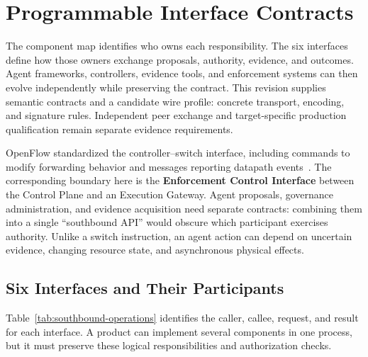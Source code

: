 \section{Programmable Interface Contracts}
\label{sec:interfaces}

The component map identifies who owns each responsibility. The six interfaces define how those owners exchange proposals, authority, evidence, and outcomes. Agent frameworks, controllers, evidence tools, and enforcement systems can then evolve independently while preserving the contract. This revision supplies semantic contracts and a candidate wire profile: concrete transport, encoding, and signature rules. Independent peer exchange and target-specific production qualification remain separate evidence requirements.

OpenFlow standardized the controller--switch interface, including commands to modify forwarding behavior and messages reporting datapath events~\cite{openflow151}. The corresponding boundary here is the \textbf{Enforcement Control Interface} between the Control Plane and an Execution Gateway. Agent proposals, governance administration, and evidence acquisition need separate contracts: combining them into a single ``southbound API'' would obscure which participant exercises authority. Unlike a switch instruction, an agent action can depend on uncertain evidence, changing resource state, and asynchronous physical effects.

\subsection{Six Interfaces and Their Participants}
Table~\ref{tab:southbound-operations} identifies the caller, callee, request, and result for each interface. A product can implement several components in one process, but it must preserve these logical responsibilities and authorization checks.

